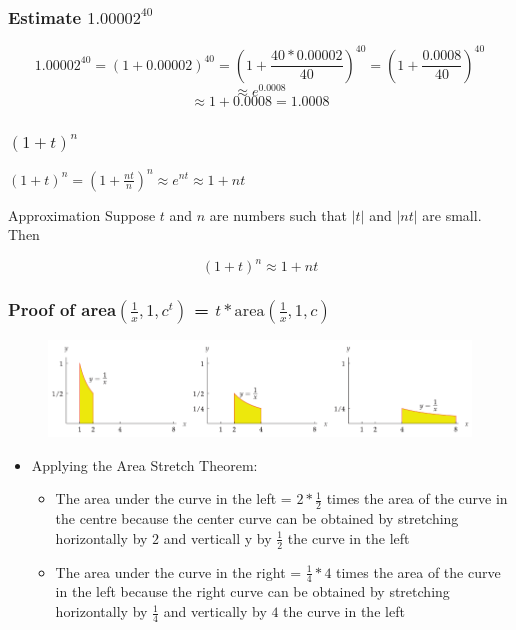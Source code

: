 \documentclass{beamer}
\begin{document}
\begin{frame}
  \frametitle{Estimate \(1.00002^{40}\)}  
  \[ 1.00002^{40} = \left(1 + 0.00002\right)^{40} = \left(1 + \frac{40*0.00002}{40} \right)^{40} = \left(1 + \frac{0.0008}{40} \right)^{40} \]\[ \approx e^{0.0008}\]
  \[\approx 1 + 0.0008 = 1.0008 \]
\end{frame}

\begin{frame}
  \frametitle{ \( \left(1 + t\right)^{n}\)}
  
  \( \left( 1 + t\right)^{n} = \left(1 + \frac{nt}{n}\right)^{n} \approx e^{nt} \approx  1 + nt  \)

  \begin{block}{Approximation}
   Suppose \(t\) and \(n\) are numbers such that \(|t|\) and \(|nt|\) are small. Then  
   
   \[ \left(1+t\right)^{n} \approx 1 + nt \]
    
  \end{block}
\end{frame}

\begin{frame}
  \frametitle{Proof of area\( \left( \frac{1}{x}, 1, c^{t} \right) \) = \(t*\text{area}(\frac{1}{x}, 1, c)\)}

  \begin{figure}
    \centering 
    \includegraphics[scale=0.3]{e_8.png}
  \end{figure}
  \begin{itemize}
    \item Applying the Area Stretch Theorem:
    \begin{itemize}
      \item The area under the curve in the left  = \(2*\frac{1}{2}\) times the area of the curve in the centre because the center curve can be obtained by stretching horizontally by \(2\) and verticall y by \(\frac{1}{2}\) the curve in the left 
    \item The area under the curve in the right  = \(\frac{1}{4}*4\) times the area of the curve in the left because the right curve can be obtained by stretching horizontally by \(\frac{1}{4}\) and vertically by \(4\) the curve in the left 
  \end{itemize}
  \end{itemize}

\end{frame}
\end{document}
